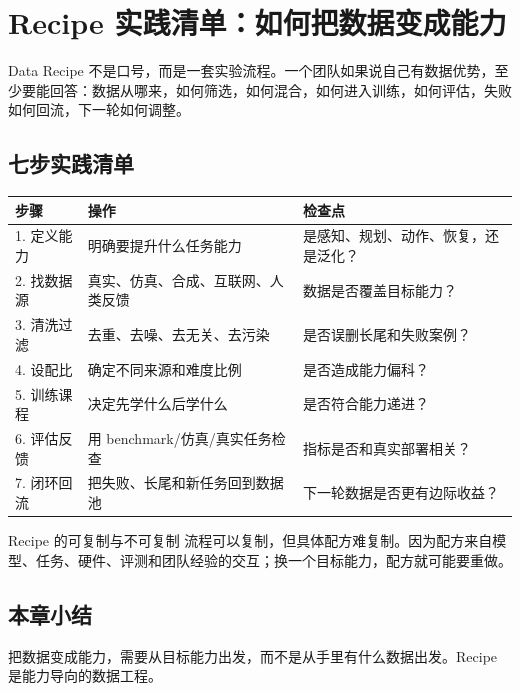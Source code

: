 \section{Recipe 实践清单：如何把数据变成能力}

Data Recipe 不是口号，而是一套实验流程。一个团队如果说自己有数据优势，至少要能回答：数据从哪来，如何筛选，如何混合，如何进入训练，如何评估，失败如何回流，下一轮如何调整。

\subsection{七步实践清单}

\noindent\begin{longtable}{p{}p{}p{}}
\toprule
步骤 & 操作 & 检查点 \\
\midrule
1. 定义能力 & 明确要提升什么任务能力 & 是感知、规划、动作、恢复，还是泛化？ \\
2. 找数据源 & 真实、仿真、合成、互联网、人类反馈 & 数据是否覆盖目标能力？ \\
3. 清洗过滤 & 去重、去噪、去无关、去污染 & 是否误删长尾和失败案例？ \\
4. 设配比 & 确定不同来源和难度比例 & 是否造成能力偏科？ \\
5. 训练课程 & 决定先学什么后学什么 & 是否符合能力递进？ \\
6. 评估反馈 & 用 benchmark/仿真/真实任务检查 & 指标是否和真实部署相关？ \\
7. 闭环回流 & 把失败、长尾和新任务回到数据池 & 下一轮数据是否更有边际收益？ \\
\bottomrule
\end{longtable}

\begin{knowledgebox}{Recipe 的可复制与不可复制}
流程可以复制，但具体配方难复制。因为配方来自模型、任务、硬件、评测和团队经验的交互；换一个目标能力，配方就可能要重做。
\end{knowledgebox}

\subsection{本章小结}

把数据变成能力，需要从目标能力出发，而不是从手里有什么数据出发。Recipe 是能力导向的数据工程。

